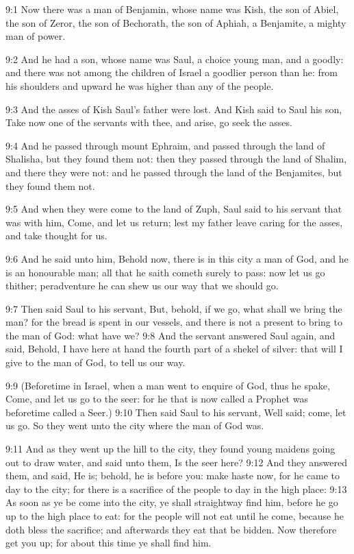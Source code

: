 9:1 Now there was a man of Benjamin, whose name was Kish, the son of Abiel, the son of Zeror, the son of Bechorath, the son of Aphiah, a Benjamite, a mighty man of power.

9:2 And he had a son, whose name was Saul, a choice young man, and a goodly: and there was not among the children of Israel a goodlier person than he: from his shoulders and upward he was higher than any of the people.

9:3 And the asses of Kish Saul's father were lost. And Kish said to Saul his son, Take now one of the servants with thee, and arise, go seek the asses.

9:4 And he passed through mount Ephraim, and passed through the land of Shalisha, but they found them not: then they passed through the land of Shalim, and there they were not: and he passed through the land of the Benjamites, but they found them not.

9:5 And when they were come to the land of Zuph, Saul said to his servant that was with him, Come, and let us return; lest my father leave caring for the asses, and take thought for us.

9:6 And he said unto him, Behold now, there is in this city a man of God, and he is an honourable man; all that he saith cometh surely to pass: now let us go thither; peradventure he can shew us our way that we should go.

9:7 Then said Saul to his servant, But, behold, if we go, what shall we bring the man? for the bread is spent in our vessels, and there is not a present to bring to the man of God: what have we?  9:8 And the servant answered Saul again, and said, Behold, I have here at hand the fourth part of a shekel of silver: that will I give to the man of God, to tell us our way.

9:9 (Beforetime in Israel, when a man went to enquire of God, thus he spake, Come, and let us go to the seer: for he that is now called a Prophet was beforetime called a Seer.)  9:10 Then said Saul to his servant, Well said; come, let us go. So they went unto the city where the man of God was.

9:11 And as they went up the hill to the city, they found young maidens going out to draw water, and said unto them, Is the seer here?  9:12 And they answered them, and said, He is; behold, he is before you: make haste now, for he came to day to the city; for there is a sacrifice of the people to day in the high place: 9:13 As soon as ye be come into the city, ye shall straightway find him, before he go up to the high place to eat: for the people will not eat until he come, because he doth bless the sacrifice; and afterwards they eat that be bidden. Now therefore get you up; for about this time ye shall find him.

